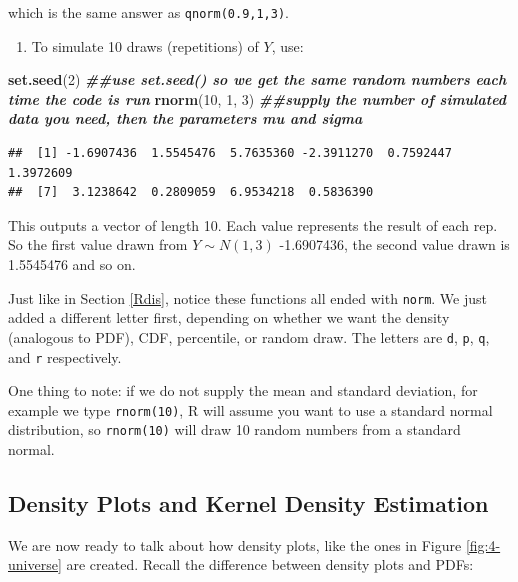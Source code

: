 \documentclass[
]{book}
\newenvironment{Shaded}{\begin{snugshade}}{\end{snugshade}}
\newcommand{\DecValTok}[1]{\textcolor[rgb]{0.00,0.00,0.81}{#1}}
\newcommand{\DocumentationTok}[1]{\textcolor[rgb]{0.56,0.35,0.01}{\textbf{\textit{#1}}}}
\newcommand{\FunctionTok}[1]{\textcolor[rgb]{0.13,0.29,0.53}{\textbf{#1}}}
\newcommand{\NormalTok}[1]{#1}
\providecommand{\tightlist}{%
  \setlength{\itemsep}{0pt}\setlength{\parskip}{0pt}}
\begin{document}
which is the same answer as \texttt{qnorm(0.9,1,3)}.

\begin{enumerate}
\def\labelenumi{\arabic{enumi}.}
\setcounter{enumi}{3}
\tightlist
\item
  To simulate 10 draws (repetitions) of \(Y\), use:
\end{enumerate}

\begin{Shaded}
\begin{Highlighting}[]
\FunctionTok{set.seed}\NormalTok{(}\DecValTok{2}\NormalTok{) }\DocumentationTok{\#\#use set.seed() so we get the same random numbers each time the code is run}
\FunctionTok{rnorm}\NormalTok{(}\DecValTok{10}\NormalTok{, }\DecValTok{1}\NormalTok{, }\DecValTok{3}\NormalTok{) }\DocumentationTok{\#\#supply the number of simulated data you need, then the parameters mu and sigma}
\end{Highlighting}
\end{Shaded}

\begin{verbatim}
##  [1] -1.6907436  1.5545476  5.7635360 -2.3911270  0.7592447  1.3972609
##  [7]  3.1238642  0.2809059  6.9534218  0.5836390
\end{verbatim}

This outputs a vector of length 10. Each value represents the result of each rep. So the first value drawn from \(Y \sim N(1,3)\) -1.6907436, the second value drawn is 1.5545476 and so on.

Just like in Section \ref{Rdis}, notice these functions all ended with \texttt{norm}. We just added a different letter first, depending on whether we want the density (analogous to PDF), CDF, percentile, or random draw. The letters are \texttt{d}, \texttt{p}, \texttt{q}, and \texttt{r} respectively.

One thing to note: if we do not supply the mean and standard deviation, for example we type \texttt{rnorm(10)}, R will assume you want to use a standard normal distribution, so \texttt{rnorm(10)} will draw 10 random numbers from a standard normal.

\subsection{Density Plots and Kernel Density Estimation}\label{KDE}

We are now ready to talk about how density plots, like the ones in Figure \ref{fig:4-universe} are created. Recall the difference between density plots and PDFs:
\end{document}
